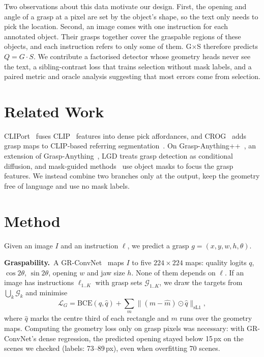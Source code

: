 \documentclass[10pt,twocolumn,letterpaper]{article}
\newcommand{\ours}{G$\times$S\xspace}
\newcommand{\para}[1]{\par\noindent\textbf{#1}\ }
\begin{document}
Two observations about this data motivate our design. First, the opening and angle of a grasp at a
pixel are set by the object's shape, so the text only needs to pick the location. Second, an
image comes with one instruction for each annotated object. Their grasps together cover the graspable
regions of these objects, and each instruction refers to only some of them. \ours therefore predicts
$Q=G\cdot S$. We contribute a factorised detector whose geometry heads never see
the text, a sibling-contrast loss that trains selection without mask labels, and a paired metric and
oracle analysis suggesting that most errors come from selection.

\section{Related Work}
CLIPort~\cite{shridhar2021cliport} fuses CLIP~\cite{radford2021clip} features into dense pick
affordances, and CROG~\cite{tziafas2023crog} adds grasp maps to CLIP-based referring
segmentation~\cite{wang2022cris}. On Grasp-Anything++~\cite{vuong2024lgd}, an extension
of Grasp-Anything~\cite{vuong2024graspanything}, LGD treats grasp detection as conditional
diffusion, and mask-guided methods~\cite{vo2024maskgrasp,bhat2025maplegrasp} use object masks to focus
the grasp features. We instead combine two branches only at the output, keep the geometry
free of language and use no mask labels.

\section{Method}
Given an image $I$ and an instruction $\ell$, we predict a grasp $g=(x,y,w,h,\theta)$.
\para{Graspability.}A GR-ConvNet~\cite{kumra2020grconvnet} maps $I$ to five $224{\times}224$ maps:
quality logits $q$, $\cos2\theta$, $\sin2\theta$, opening $w$ and jaw size $h$. None of them depends
on $\ell$. If an image has instructions $\ell_{1..K}$ with grasp sets $\mathcal{G}_{1..K}$, we draw the
targets from $\bigcup_k\mathcal{G}_k$ and minimise
\begin{equation}
\mathcal{L}_G=\mathrm{BCE}(q,\hat q)+\textstyle\sum_{m}\big\lVert (m-\hat m)\odot\hat q\big\rVert_{\text{sL1}},
\end{equation}
where $\hat q$ marks the centre third of each rectangle and $m$ runs over the geometry maps. Computing the
geometry loss only on grasp pixels was necessary: with GR-ConvNet's dense regression, the predicted
opening stayed below 15\,px on the scenes we checked (labels: 73--89\,px), even when overfitting 70 scenes.
\end{document}
